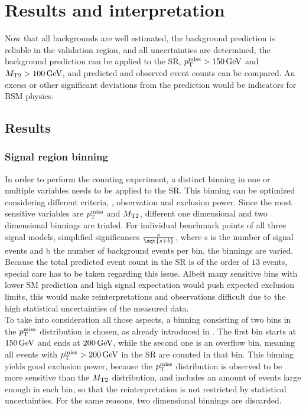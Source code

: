 \chapter{Results and interpretation}\label{chap:results}
\minitoc
Now that all backgrounds are well estimated, the background prediction is reliable in the validation region, and all uncertainties are determined, the background prediction can be applied to the SR, $p_{\mathrm{T}}^\text{miss}>150\,\text{Ge\hspace{-.08em}V}$ and $M_{\mathrm{T2}}>100\,\text{Ge\hspace{-.08em}V}$, and predicted and observed event counts can be compared. An excess or other significant deviations from the prediction would be indicators for BSM physics.
\section{Results}\label{sec:results}
\subsection*{Signal region binning}
In order to perform the counting experiment, a distinct binning in one or multiple variables needs to be applied to the SR. This binning can be optimized considering different criteria, \eg, observation and exclusion power. Since the most sensitive variables are $p_{\mathrm{T}}^\text{miss}$ and $M_{\mathrm{T2}}$, different one dimensional and two dimensional binnings are trialed. For individual benchmark points of all three signal models, simplified significances $\frac{s}{\sqt{s+b}}$, where s is the number of signal events and b the number of background events per bin, the binnings are varied. Because the total predicted event count in the SR is of the order of $13$ events, special care has to be taken regarding this issue. Albeit many sensitive bins with lower SM prediction and high signal expectation would push expected exclusion limits, this would make reinterpretations and observations difficult due to the high statistical uncertainties of the measured data.\\
To take into consideration all those aspects, a binning consisting of two bins in the $p_{\mathrm{T}}^\text{miss}$ distribution is chosen, as already introduced in . The first bin starts at $150\,\text{Ge\hspace{-.08em}V}$ and ends at $200\,\text{Ge\hspace{-.08em}V}$, while the second one is an overflow bin, meaning all events with $p_{\mathrm{T}}^\text{miss}>200\,\text{Ge\hspace{-.08em}V}$ in the SR are counted in that bin. This binning yields good exclusion power, because the $p_{\mathrm{T}}^\text{miss}$ distribution is observed to be more sensitive than the $M_{\mathrm{T2}}$ distribution, and includes an amount of events large enough in each bin, so that the reinterpretation is not restricted by statistical uncertainties. For the same reasons, two dimensional binnings are discarded.
